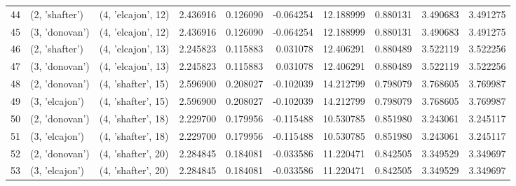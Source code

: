 \begin{tabular}{lllrrrrrrr}
44 &   (2, 'shafter') &  (4, 'elcajon', 12) &  2.436916 &   0.126090 & -0.064254 &  12.188999 &  0.880131 &   3.490683 &  3.491275 \\
45 &   (3, 'donovan') &  (4, 'elcajon', 12) &  2.436916 &   0.126090 & -0.064254 &  12.188999 &  0.880131 &   3.490683 &  3.491275 \\
46 &   (2, 'shafter') &  (4, 'elcajon', 13) &  2.245823 &   0.115883 &  0.031078 &  12.406291 &  0.880489 &   3.522119 &  3.522256 \\
47 &   (3, 'donovan') &  (4, 'elcajon', 13) &  2.245823 &   0.115883 &  0.031078 &  12.406291 &  0.880489 &   3.522119 &  3.522256 \\
48 &   (2, 'donovan') &  (4, 'shafter', 15) &  2.596900 &   0.208027 & -0.102039 &  14.212799 &  0.798079 &   3.768605 &  3.769987 \\
49 &   (3, 'elcajon') &  (4, 'shafter', 15) &  2.596900 &   0.208027 & -0.102039 &  14.212799 &  0.798079 &   3.768605 &  3.769987 \\
50 &   (2, 'donovan') &  (4, 'shafter', 18) &  2.229700 &   0.179956 & -0.115488 &  10.530785 &  0.851980 &   3.243061 &  3.245117 \\
51 &   (3, 'elcajon') &  (4, 'shafter', 18) &  2.229700 &   0.179956 & -0.115488 &  10.530785 &  0.851980 &   3.243061 &  3.245117 \\
52 &   (2, 'donovan') &  (4, 'shafter', 20) &  2.284845 &   0.184081 & -0.033586 &  11.220471 &  0.842505 &   3.349529 &  3.349697 \\
53 &   (3, 'elcajon') &  (4, 'shafter', 20) &  2.284845 &   0.184081 & -0.033586 &  11.220471 &  0.842505 &   3.349529 &  3.349697 \\
\bottomrule
\end{tabular}

